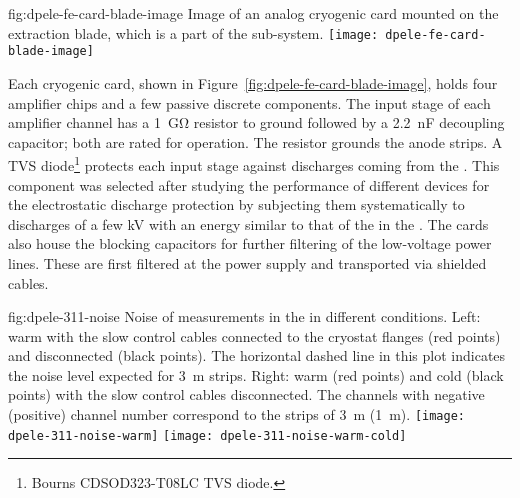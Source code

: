 \begin{dunefigure}{fig:dpele-fe-card-blade-image}
{Image of an analog cryogenic  card mounted on the extraction blade, which is a part of the  sub-system.}
\texttt{[image: dpele-fe-card-blade-image]}
\end{dunefigure}

Each cryogenic  card, shown in Figure~\ref{fig:dpele-fe-card-blade-image}, %
holds four  amplifier chips and a few passive discrete components. The input stage of each amplifier channel has a \SI{1}{\giga\ohm} resistor to ground followed by a \SI{2.2}{\nano\farad} decoupling capacitor; both are rated for  operation. The %
resistor grounds the  anode strips. A TVS diode\footnote{Bourns\texttrademark{} CDSOD323-T08LC TVS diode.} protects each input stage against discharges coming from the . This component was selected after studying the performance of different devices for the electrostatic discharge protection by subjecting them systematically to discharges of a few \si{kV} with an energy similar to that of the  in the . The  cards also house the blocking capacitors for further filtering of the low-voltage power lines. These are first filtered at the power supply and transported via shielded cables.

\begin{dunefigure}{fig:dpele-311-noise}
{Noise of measurements in the  in different conditions. Left: warm with the slow control cables connected to the cryostat flanges (red points) and disconnected (black points). The horizontal dashed line in this plot indicates the noise level expected for \SI{3}{\meter} strips. Right: warm (red points) and cold (black points) with the slow control cables disconnected. The channels with negative (positive) channel number correspond to the strips of \SI{3}{\meter} (\SI{1}{\meter}).}
\texttt{[image: dpele-311-noise-warm]}
\texttt{[image: dpele-311-noise-warm-cold]}
\end{dunefigure}

